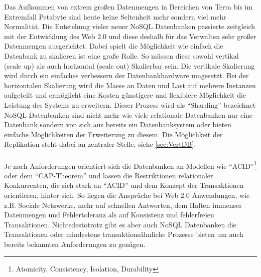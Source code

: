 \documentclass[a4paper,11pt,oneside,%
headsepline,												%
footsepline,												%
bibtotocnumbered									%
]{scrreprt}
\begin{document}
Das Aufkommen von extrem großen Datenmengen in Bereichen von Terra bis im Extremfall Petabyte sind heute keine Seltenheit mehr sondern viel mehr Normalität. Die Entstehung vieler neuer NoSQL Datenbanken passierte zeitgleich mit der Entwicklung des Web 2.0 und diese deshalb für das Verwalten sehr großer Datenmengen ausgerichtet.
Dabei spielt die Möglichkeit wie einfach die Datenbank zu skalieren ist eine große Rolle. So müssen diese sowohl vertikal (scale up) als auch horizontal (scale out) Skalierbar sein. Die vertikale Skalierung wird durch ein einfaches verbessern der Datenbankhardware umgesetzt. Bei der horizontalen Skalierung wird die Masse an Daten und Last auf mehrere Instanzen aufgeteilt und ermöglicht eine Kosten günstigere und flexiblere Möglichkeit die Leistung des Systems zu erweitern. Dieser Prozess wird als \enquote{Sharding} bezeichnet
NoSQL Datenbanken sind nicht mehr wie viele relationale Datenbanken nur eine Datenbank sondern von sich aus bereits ein Datenbanksystem oder bieten einfache Möglichkeiten der Erweiterung zu diesem. Die Möglichkeit der Replikation steht dabei an zentraler Stelle, siehe \autoref{sec:VertDB}.\\\\
Je nach Anforderungen orientiert sich die Datenbanken an Modellen wie \enquote{ACID}\footnote{Atomicity, Consistency, Isolation, Durability} oder dem \enquote{CAP-Theorem} und lassen die Restriktionen relationaler Konkurrenten, die sich stark an \enquote{ACID} und dem Konzept der Transaktionen orientieren, hinter sich. So liegen die Ansprüche bei  Web 2.0 Anwendungen, wie z.B. Sociale Netzwerke, mehr auf schnellen Antworten, dem Halten immenser Datenmengen und Fehlertoleranz als auf Konsistenz und fehlerfreien Transaktionen.
Nichtsdestotrotz gibt es aber auch NoSQL Datenbanken die Transaktionen oder mindestens transaktionsähnliche Prozesse bieten um auch bereits bekannten Anforderungen zu genügen.
\end{document}
